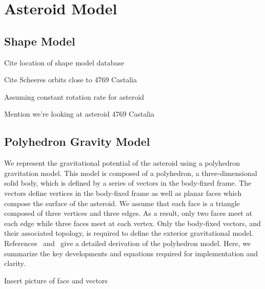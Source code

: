 \documentclass[]{aiaa-tc}%
\begin{document}
\section{Asteroid Model}

\subsection{Shape Model}
Cite location of shape model database

Cite Scheeres orbits close to 4769 Castalia

Assuming constant rotation rate for asteroid

Mention we're looking at asteroid 4769 Castalia

\subsection{Polyhedron Gravity Model}

We represent the gravitational potential of the asteroid using a polyhedron gravitation model.
This model is composed of a polyhedron, a three-dimensional solid body, which is defined by a series of vectors in the body-fixed frame.
The vectors define vertices in the body-fixed frame as well as planar faces which compose the surface of the asteroid.
We assume that each face is a triangle composed of three vertices and three edges.
As a result, only two faces meet at each edge while three faces meet at each vertex.
Only the body-fixed vectors, and their associated topology, is required to define the exterior gravitational model.
References~ and~ give a detailed derivation of the polyhedron model.
Here, we summarize the key developments and equations required for implementation and clarity.

{\LARGE Insert picture of face and vectors}
\end{document}
